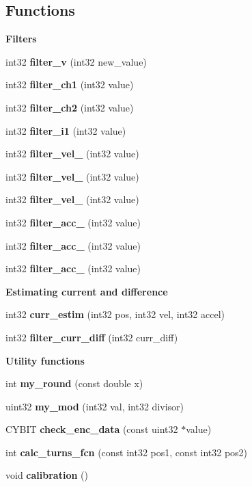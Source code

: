 \subsection*{Functions}
\begin{Indent}\textbf{ Filters}\par
\begin{DoxyCompactItemize}
\item 
int32 \textbf{ filter\+\_\+v} (int32 new\+\_\+value)
\item 
int32 \textbf{ filter\+\_\+ch1} (int32 value)
\item 
int32 \textbf{ filter\+\_\+ch2} (int32 value)
\item 
int32 \textbf{ filter\+\_\+i1} (int32 value)
\item 
int32 \textbf{ filter\+\_\+vel\+\_} (int32 value)
\item 
int32 \textbf{ filter\+\_\+vel\+\_} (int32 value)
\item 
int32 \textbf{ filter\+\_\+vel\+\_} (int32 value)
\item 
int32 \textbf{ filter\+\_\+acc\+\_} (int32 value)
\item 
int32 \textbf{ filter\+\_\+acc\+\_} (int32 value)
\item 
int32 \textbf{ filter\+\_\+acc\+\_} (int32 value)
\end{DoxyCompactItemize}
\end{Indent}
\begin{Indent}\textbf{ Estimating current and difference}\par
\begin{DoxyCompactItemize}
\item 
int32 \textbf{ curr\+\_\+estim} (int32 pos, int32 vel, int32 accel)
\item 
int32 \textbf{ filter\+\_\+curr\+\_\+diff} (int32 curr\+\_\+diff)
\end{DoxyCompactItemize}
\end{Indent}
\begin{Indent}\textbf{ Utility functions}\par
\begin{DoxyCompactItemize}
\item 
int \textbf{ my\+\_\+round} (const double x)
\item 
uint32 \textbf{ my\+\_\+mod} (int32 val, int32 divisor)
\item 
C\+Y\+B\+IT \textbf{ check\+\_\+enc\+\_\+data} (const uint32 $\ast$value)
\item 
int \textbf{ calc\+\_\+turns\+\_\+fcn} (const int32 pos1, const int32 pos2)
\item 
void \textbf{ calibration} ()
\end{DoxyCompactItemize}
\end{Indent}



